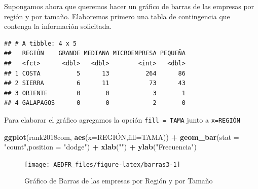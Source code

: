 \documentclass[letterpaper,]{book}
\newenvironment{Shaded}{\begin{snugshade}}{\end{snugshade}}
\newcommand{\DataTypeTok}[1]{\textcolor[rgb]{0.13,0.29,0.53}{#1}}
\newcommand{\DecValTok}[1]{\textcolor[rgb]{0.00,0.00,0.81}{#1}}
\newcommand{\KeywordTok}[1]{\textcolor[rgb]{0.13,0.29,0.53}{\textbf{#1}}}
\newcommand{\NormalTok}[1]{#1}
\newcommand{\OperatorTok}[1]{\textcolor[rgb]{0.81,0.36,0.00}{\textbf{#1}}}
\newcommand{\StringTok}[1]{\textcolor[rgb]{0.31,0.60,0.02}{#1}}
\begin{document}
Supongamos ahora que queremos hacer un gráfico de barras de las empresas por región y por tamaño. Elaboremos primero una tabla de contingencia que contenga la información solicitada.

\begin{Shaded}
\end{Shaded}

\begin{verbatim}
## # A tibble: 4 x 5
##   REGIÓN    GRANDE MEDIANA MICROEMPRESA PEQUEÑA
##   <fct>      <dbl>   <dbl>        <int>   <dbl>
## 1 COSTA          5      13          264      86
## 2 SIERRA         6      11           73      43
## 3 ORIENTE        0       0            3       1
## 4 GALAPAGOS      0       0            2       0
\end{verbatim}

Para elaborar el gráfico agregamos la opción \texttt{fill\ =\ TAMA} junto a \texttt{x=REGIÓN}

\begin{Shaded}
\begin{Highlighting}[]
\KeywordTok{ggplot}\NormalTok{(rank2018com, }\KeywordTok{aes}\NormalTok{(}\DataTypeTok{x=}\NormalTok{REGIÓN,}\DataTypeTok{fill=}\NormalTok{TAMA)) }\OperatorTok{+}\StringTok{ }
\StringTok{  }\KeywordTok{geom_bar}\NormalTok{(}\DataTypeTok{stat =} \StringTok{"count"}\NormalTok{,}\DataTypeTok{position =} \StringTok{"dodge"}\NormalTok{) }\OperatorTok{+}
\StringTok{  }\KeywordTok{xlab}\NormalTok{(}\StringTok{""}\NormalTok{) }\OperatorTok{+}\StringTok{ }\KeywordTok{ylab}\NormalTok{(}\StringTok{"Frecuencia"}\NormalTok{)}
\end{Highlighting}
\end{Shaded}

\begin{figure}[h!]

{\centering \texttt{[image: AEDFR\_files/figure-latex/barras3-1]} 

}

\caption{Gráfico de Barras de las empresas por Región y por Tamaño}\label{fig:barras3}
\end{figure}
\end{document}
